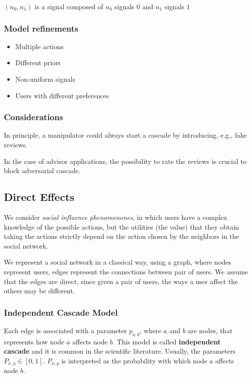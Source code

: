 \documentclass[10pt,a4paper]{article}
\begin{document}
$(n_0, n_1)$ is a signal composed of $n_0$ signals $0$ and $n_1$ signals $1$

\subsubsection{Model refinements}\label{model-refinements}

\begin{itemize}
\item Multiple actions
\item Different priors
\item Non-uniform signals
\item Users with different preferences
\end{itemize}

\subsubsection{Considerations}\label{considerations}

In principle, a manipulator could always start a cascade by introducing, e.g., fake reviews.

In the case of advisor applications, the possibility to rate the reviews is crucial to block adversarial cascade.

\subsection{Direct Effects}\label{direct-effects}

We consider \textit{social influence phenomenones}, in which users have a complex knowledge of the possible actions, but the utilities (the value) that they obtain taking the actions strictly depend on the action chosen by the neighbors in the social network.

We represent a social network in a classical way, using a graph, where nodes represent users, edges represent the connections between pair of users. We assume that the edges are direct, since given a pair of users, the ways a user affect the others may be different.

\subsubsection{Independent Cascade
Model}\label{independent-cascade-model}

Each edge is associated with a parameter $p_{a,b}$, where $a$ and $b$ are nodes, that represents how node $a$ affects node $b$. This model is called \textbf{independent cascade} and it is common in the scientific literature. Usually, the parameters $P_{x,y} \in [0,1]$. $P_{x,y}$ is interpreted as the probability with which node $a$ affects node $b$.
\end{document}
